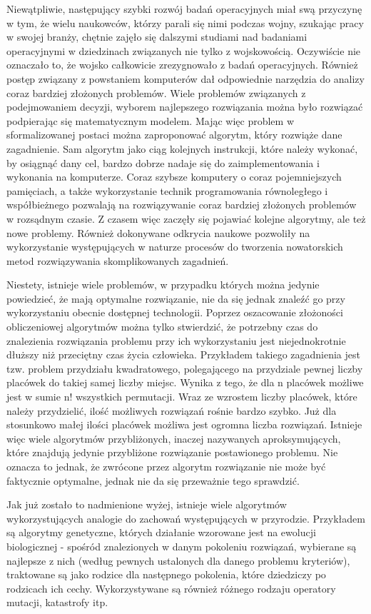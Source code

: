 Niewątpliwie, następujący szybki rozwój badań operacyjnych miał swą przyczynę  w tym, że wielu naukowców, którzy parali się nimi podczas wojny, szukając pracy w swojej branży, chętnie zajęło się dalszymi studiami nad badaniami operacyjnymi w dziedzinach związanych nie tylko z wojskowością. Oczywiście nie oznaczało to, że wojsko całkowicie zrezygnowało z badań operacyjnych. Również postęp związany z powstaniem komputerów dał odpowiednie narzędzia do analizy coraz bardziej złożonych problemów. Wiele problemów związanych z podejmowaniem decyzji, wyborem najlepszego rozwiązania można było rozwiązać podpierając się matematycznym modelem. Mając więc problem w sformalizowanej postaci można zaproponować algorytm, który rozwiąże dane zagadnienie. Sam algorytm jako ciąg kolejnych instrukcji, które należy wykonać, by osiągnąć dany cel, bardzo dobrze nadaje się do zaimplementowania i wykonania na komputerze. Coraz szybsze komputery o coraz pojemniejszych pamięciach, a także wykorzystanie technik programowania równoległego i współbieżnego pozwalają na rozwiązywanie coraz bardziej złożonych problemów w rozsądnym czasie. Z czasem więc zaczęły się pojawiać kolejne algorytmy, ale też nowe problemy. Również dokonywane odkrycia naukowe pozwoliły na wykorzystanie występujących w naturze procesów do tworzenia nowatorskich metod rozwiązywania skomplikowanych zagadnień.

Niestety, istnieje wiele problemów, w przypadku których można jedynie powiedzieć, że mają optymalne rozwiązanie, nie da się jednak znaleźć go przy wykorzystaniu obecnie dostępnej technologii. Poprzez oszacowanie złożoności obliczeniowej algorytmów można tylko stwierdzić, że potrzebny czas do znalezienia rozwiązania problemu przy ich wykorzystaniu jest niejednokrotnie dłuższy niż przeciętny czas życia człowieka. Przykładem takiego zagadnienia jest tzw. problem przydziału kwadratowego, polegającego na przydziale pewnej liczby placówek do takiej samej liczby miejsc. Wynika z tego, że dla n placówek możliwe jest w sumie n! wszystkich permutacji. Wraz ze wzrostem liczby placówek, które należy przydzielić, ilość możliwych rozwiązań rośnie bardzo szybko. Już dla stosunkowo małej ilości placówek możliwa jest ogromna liczba rozwiązań. Istnieje  więc wiele algorytmów przybliżonych, inaczej nazywanych aproksymujących, które znajdują jedynie przybliżone rozwiązanie postawionego problemu. Nie oznacza to jednak, że zwrócone przez algorytm rozwiązanie nie może być faktycznie optymalne, jednak nie da się przeważnie tego sprawdzić.

Jak już zostało to nadmienione wyżej, istnieje wiele algorytmów wykorzystujących analogie do zachowań występujących w przyrodzie. Przykładem są algorytmy genetyczne, których działanie wzorowane jest na ewolucji biologicznej - spośród znalezionych w danym pokoleniu rozwiązań, wybierane są najlepsze z nich (według pewnych ustalonych dla danego problemu kryteriów), traktowane są jako rodzice dla następnego pokolenia, które dziedziczy po rodzicach ich cechy. Wykorzystywane są również różnego rodzaju operatory mutacji, katastrofy itp. 

